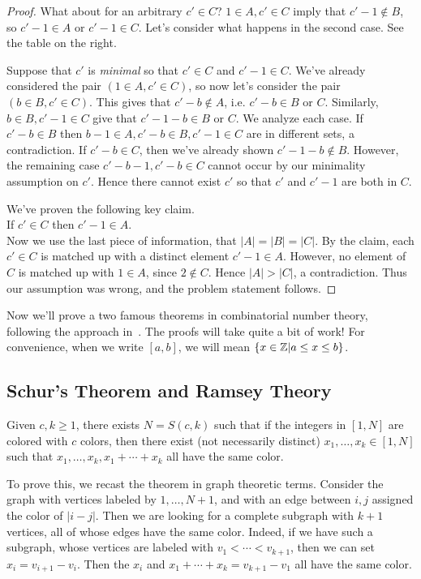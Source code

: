 \begin{proof}
What about for an arbitrary $c'\in C$? $1\in A, c'\in C$ imply that $c'-1\nin B$, so $c'-1\in A$ or $c'-1\in C$. Let's consider what happens in the second case. See the table on the right.

Suppose that $c'$ is {\it minimal} so that $c'\in C$ and $c'-1\in C$. We've already considered the pair $(1\in A, c'\in C)$, so now let's consider the pair $(b\in B, c'\in C)$. This gives that $c'-b\nin A$, i.e. $c'-b\in B$ or $C$. Similarly, $b\in B, c'-1\in C$ give that $c'-1-b\in B$ or $C$. We analyze each case.
If $c'-b\in B$ then $b-1\in A, c'-b\in B, c'-1\in C$ are in different sets, a contradiction. If $c'-b\in C$, then we've already shown $c'-1-b\nin B$. However, the remaining case $c'-b-1,c'-b\in C$ cannot occur by our minimality assumption on $c'$. Hence there cannot exist $c'$ so that $c'$ and $c'-1$ are both in $C$.

We've proven the following key claim.\\

 If $c'\in C$ then $c'-1\in A$.\\

Now we use the last piece of information, that $|A|=|B|=|C|$. By the claim, each $c'\in C$ is matched up with a distinct element $c'-1\in A$. However, no element of $C$ is matched up with $1\in A$, since $2\nin C$. Hence $|A|>|C|$, a contradiction. Thus our assumption was wrong, and the problem statement follows.
\end{proof}

Now we'll prove a two famous theorems in combinatorial number theory, following the approach in~\cite[\S6.3]{TV}. The proofs will take quite a bit of work! For convenience, when we write $[a,b]$, we will mean $\{x\in \mathbb{Z}|a\leq x\leq b\}$.

\subsection{Schur's Theorem and Ramsey Theory}
\begin{thm}[Schur]
Given $c,k\geq 1$, there exists $N=S(c,k)$ such that if the integers in $[1,N]$ are colored with $c$ colors, then there exist (not necessarily distinct) $x_1,\ldots, x_k\in [1,N]$ such that $x_1,\ldots, x_k, x_1+\cdots +x_k$ all have the same color.
\end{thm}
To prove this, we recast the theorem in graph theoretic terms. Consider the graph with vertices labeled by $1, \ldots, N+1$, and with an edge between $i,j$ assigned the color of $|i-j|$. Then we are looking for a complete subgraph with $k+1$ vertices, all of whose edges have the same color. Indeed, if we have such a subgraph, whose vertices are labeled with $v_1<\cdots< v_{k+1}$, then we can set $x_i=v_{i+1}-v_i$. Then the $x_i$ and $x_1+\cdots +x_k=v_{k+1}-v_1$ all have the same color.

